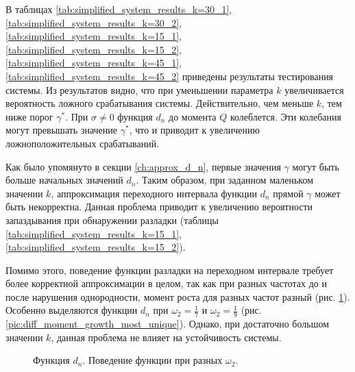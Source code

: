 \documentclass[specialist, substylefile = spbu.rtx,
			   subf, href, 12pt]{disser}
\begin{document}
В таблицах \ref{tab:simplified_system_results_k=30_1}, \ref{tab:simplified_system_results_k=30_2}, \ref{tab:simplified_system_results_k=15_1}, \ref{tab:simplified_system_results_k=15_2}, \ref{tab:simplified_system_results_k=45_1}, \ref{tab:simplified_system_results_k=45_2} приведены результаты тестирования системы. Из результатов видно, что при уменьшении параметра $ k $ увеличивается вероятность ложного срабатывания системы. Действительно, чем меньше $ k $, тем ниже порог $ \gamma^* $. При $ \sigma \neq 0 $ функция $ d_n $ до момента $ Q $ колеблется. Эти колебания могут превышать значение $ \gamma^* $, что и приводит к увеличению ложноположительных срабатываний.

Как было упомянуто в секции \ref{ch:approx_d_n}, первые значения $ \gamma $ могут быть больше начальных значений $ d_n $. Таким образом, при заданном маленьком значении $ k $, аппроксимация переходного интервала функции $ d_n $ прямой $ \gamma $ может быть некорректна. Данная проблема приводит к увеличению вероятности запаздывания при обнаружении разладки (таблицы \ref{tab:simplified_system_results_k=15_1}, \ref{tab:simplified_system_results_k=15_2}). 

Помимо этого, поведение функции разладки на переходном интервале требует более корректной аппроксимации в целом, так как при разных частотах до и после нарушения однородности, момент роста для разных частот разный (рис. \ref{pic:diff_moment_growth}). Особенно выделяются функции $ d_n $ при $ \omega_2 = \frac{1}{7} $ и $ \omega_2 = \frac{1}{9} $ (рис. \ref{pic:diff_moment_growth_most_unique}). Однако, при достаточно большом значении $ k $, данная проблема не влияет на устойчивость системы.

\begin{figure}[!hhh]
	\caption{Функция $ d_n $. Поведение функции при разных $ \omega_2 $.}
	\label{pic:diff_moment_growth}
\end{figure}
\end{document}
